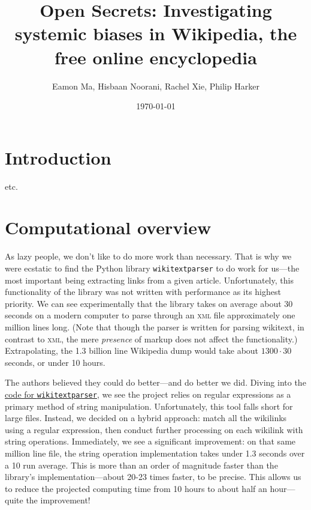 \documentclass[fontsize=12pt]{article}
\title{Open Secrets: Investigating systemic biases in Wikipedia, the free online encyclopedia}
\author{Eamon Ma, Hisbaan Noorani, Rachel Xie, Philip Harker}
\date{\today}
\newcommand{\py}[1]{\texttt{#1}}
\begin{document}
\maketitle
\begin{multicols}{2}
    \section{Introduction}
    etc.
    \section{Computational overview}
    As lazy people, we don't like to do more work than necessary. That is why we were ecstatic to find the Python library \py{wikitextparser} to do work for us---the most important being extracting links from a given article. Unfortunately, this functionality of the library was not written with performance as its highest priority. We can see experimentally that the library takes on average about 30 seconds on a modern computer to parse through an \textsc{xml} file approximately one million lines long. (Note that though the parser is written for parsing wikitext, in contrast to \textsc{xml}, the mere \emph{presence} of markup does not affect the functionality.) Extrapolating, the 1.3 billion line Wikipedia dump would take about \(1300 \cdot 30\) seconds, or under 10 hours.
    
    The authors believed they could do better---and do better we did. Diving into the \href{https://github.com/5j9/wikitextparser/blob/master/wikitextparser/_wikilink.py}{code for \py{wikitextparser}}, we see the project relies on regular expressions as a primary method of string manipulation. Unfortunately, this tool falls short for large files. Instead, we decided on a hybrid approach: match all the wikilinks using a regular expression, then conduct further processing on each wikilink with string operations. Immediately, we see a significant improvement: on that same million line file, the string operation implementation takes under 1.3 seconds over a 10 run average. This is more than an order of magnitude faster than the library's implementation---about 20-23 times faster, to be precise. This allows us to reduce the projected computing time from 10 hours to about half an hour---quite the improvement!

\end{multicols}


\linespread{2}
\newpage
\end{document}
